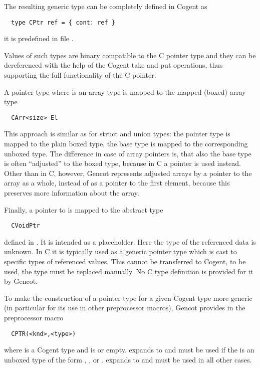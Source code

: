 The resulting generic type can be completely defined in Cogent as
\begin{verbatim}
  type CPtr ref = { cont: ref }
\end{verbatim}
it is predefined in file .

Values of such types are binary compatible to the C pointer type and they can be dereferenced with the help of
the Cogent take and put operations, thus supporting the full functionality of the C pointer.

A pointer type  where  is an array type is mapped to the mapped (boxed) array type 
\begin{verbatim}
  CArr<size> El
\end{verbatim}
This approach is similar as for struct and union types: the pointer type is mapped to the plain boxed type,
the base type is mapped to the corresponding unboxed type. The difference in case of array pointers is, that also the base
type is often ``adjusted'' to the boxed type, because in C a pointer is used instead. Other than in C, however, Gencot
represents adjusted arrays by a pointer to the array as a whole, instead of as a pointer to the first element, because
this preserves more information about the array.

Finally, a pointer to  is mapped to the abstract type
\begin{verbatim}
  CVoidPtr
\end{verbatim}
defined in .
It is intended as a placeholder. Here the type of the referenced data is unknown. In C it is typically used 
as a generic pointer type which is cast to specific types of referenced values. This cannot be transferred to
Cogent, to be used, the type must be replaced manually. No C type definition is provided for it by Gencot.

To make the construction of a pointer type for a given Cogent type more generic (in particular for its use 
in other preprocessor macros), Gencot provides in  the preprocessor macro
\begin{verbatim}
  CPTR(<knd>,<type>)
\end{verbatim}
where  is a Cogent type and  is  or empty.  expands to  and
must be used if the  is an unboxed type of the form , , or
.  expands to  and must be used in all other cases.

